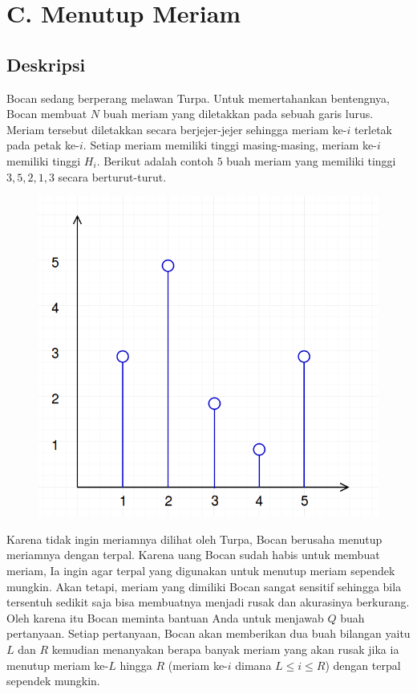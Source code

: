 \documentclass{article}
\begin{document}
\section*{\hfil C. Menutup Meriam\hfil}


\subsection*{Deskripsi}

\par\noindent Bocan sedang berperang melawan Turpa. Untuk memertahankan bentengnya, Bocan membuat $N$ buah meriam yang diletakkan pada sebuah garis lurus. Meriam tersebut diletakkan secara berjejer-jejer sehingga meriam ke-$i$ terletak pada petak ke-$i$. Setiap meriam memiliki tinggi masing-masing, meriam ke-$i$ memiliki tinggi $H_i$. Berikut adalah contoh $5$ buah meriam yang memiliki tinggi $3, 5, 2, 1, 3$ secara berturut-turut.

\begin{figure}[h!]
	\centering
	\includegraphics[width=0.2\linewidth]{meriam1.png}
\end{figure}

\par\noindent Karena tidak ingin meriamnya dilihat oleh Turpa, Bocan berusaha menutup meriamnya dengan terpal. Karena uang Bocan sudah habis untuk membuat meriam, Ia ingin agar terpal yang digunakan untuk menutup meriam sependek mungkin. Akan tetapi, meriam yang dimiliki Bocan sangat sensitif sehingga bila tersentuh sedikit saja bisa membuatnya menjadi rusak dan akurasinya berkurang. Oleh karena itu Bocan meminta bantuan Anda untuk menjawab $Q$ buah pertanyaan. Setiap pertanyaan, Bocan akan
memberikan dua buah bilangan yaitu $L$ dan $R$ kemudian menanyakan berapa banyak meriam yang akan rusak jika ia menutup meriam ke-$L$ hingga $R$ (meriam ke-$i$ dimana $L \leq i \leq R$) dengan terpal sependek mungkin.
\end{document}
